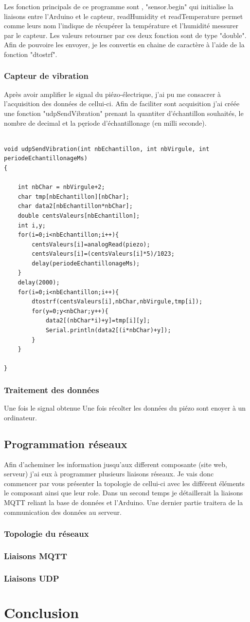 \documentclass[11pt,french,a4paper]{article}
\begin{document}
Les fonction principals de ce programme sont , "sensor.begin" qui initialise la liaisons entre l'Arduino et le capteur, readHumidity et readTemperature permet comme leurs nom l'indique de récupérer la température et l'humidité messurer par le capteur. Les valeurs retourner par ces deux fonction sont de type "double". Afin de pouvoire les envoyer, je les convertis en chaine de caractère à l'aide de la fonction "dtostrf".

\subsubsection{Capteur de vibration}
Après avoir amplifier le signal du piézo-électrique, j'ai pu me consacrer à l'acquisition des données de cellui-ci. Afin de faciliter sont acquisition j'ai créée une fonction "udpSendVibration" prenant la quantiter d'échantillon souhaités, le nombre de decimal et la pęriode d'échantillonage (en milli seconde).
\begin{scriptsize}
\begin{lstlisting}

void udpSendVibration(int nbEchantillon, int nbVirgule, int periodeEchantillonageMs)
{

	int nbChar = nbVirgule+2;
	char tmp[nbEchantillon][nbChar];
	char data2[nbEchantillon*nbChar];
	double centsValeurs[nbEchantillon];
	int i,y;
	for(i=0;i<nbEchantillon;i++){
		centsValeurs[i]=analogRead(piezo);
		centsValeurs[i]=(centsValeurs[i]*5)/1023;
		delay(periodeEchantillonageMs);
	}
	delay(2000);
	for(i=0;i<nbEchantillon;i++){
		dtostrf(centsValeurs[i],nbChar,nbVirgule,tmp[i]);
		for(y=0;y<nbChar;y++){
			data2[(nbChar*i)+y]=tmp[i][y];
			Serial.println(data2[(i*nbChar)+y]);	
		}	
	}

}
\end{lstlisting}
\end{scriptsize} 

\subsubsection{Traitement des données}
Une fois le signal obtenue 
Une fois récolter les données du piézo sont enoyer à un ordinateur. 
\subsection{Programmation réseaux}
Afin d'acheminer les information jusqu'aux different composante (site web, serveur) j'ai eux à programmer plusieurs liaisons réseaux. Je vais donc commencer par vous présenter la topologie de cellui-ci avec les différent éléments le composant ainsi que leur role. Dans un second temps je détaillerait la liaisons MQTT reliant la base de données et l'Arduino. Une dernier partie traitera de la communication des données au serveur.
\subsubsection{Topologie du réseaux}
\subsubsection{Liaisons MQTT}
\subsubsection{Liaisons UDP}
\section{Conclusion}

\newpage
\listoffigures
\end{document}
